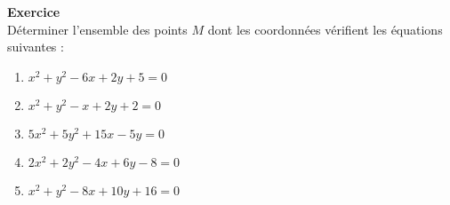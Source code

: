 \documentclass[a4paper,12pt]{article}
\begin{document}
\noindent\textbf{Exercice} \\
Déterminer l'ensemble des points \( M \) dont les coordonnées vérifient les équations suivantes :
\begin{enumerate}
    \item \( x^2 + y^2 - 6x + 2y + 5 = 0 \)
    \item \( x^2 + y^2 - x + 2y + 2 = 0 \)
    \item \( 5x^2 + 5y^2 + 15x - 5y = 0 \)
    \item \( 2x^2 + 2y^2 - 4x + 6y - 8 = 0 \)
    \item \( x^2 + y^2 - 8x + 10y + 16 = 0 \)
\end{enumerate}
\end{document}

